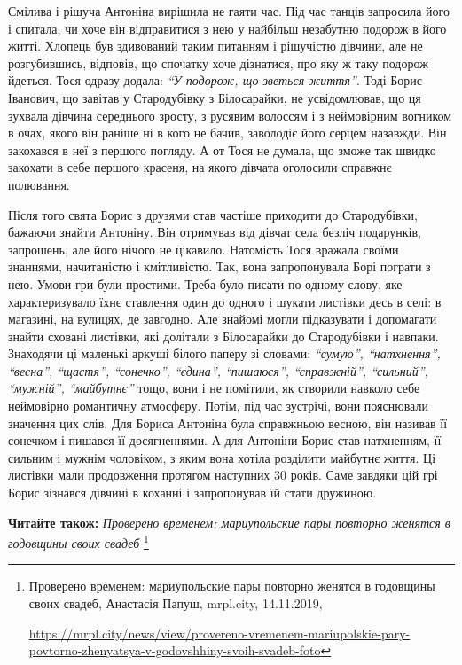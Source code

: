 
Смілива і рішуча Антоніна вирішила не гаяти час. Під час танців запросила його
і спитала, чи хоче він відправитися з нею у найбільш незабутню подорож в його
житті. Хлопець був здивований таким питанням і рішучістю дівчини, але не
розгубившись, відповів, що спочатку хоче дізнатися, про яку ж таку подорож
йдеться. Тося одразу додала: \emph{\enquote{У подорож, що зветься життя}}. Тоді Борис
Іванович, що завітав у Стародубівку з Білосарайки, не усвідомлював, що ця
зухвала дівчина середнього зросту, з русявим волоссям і з неймовірним вогником
в очах, якого він раніше ні в кого не бачив, заволодіє його серцем назавжди.
Він закохався в неї з першого погляду. А от Тося не думала, що зможе так швидко
закохати в себе першого красеня, на якого дівчата оголосили справжнє полювання.


Після того свята Борис з друзями став частіше приходити до Стародубівки,
бажаючи знайти Антоніну. Він отримував від дівчат села безліч подарунків,
запрошень, але його нічого не цікавило. Натомість Тося вражала своїми знаннями,
начитаністю і кмітливістю. Так, вона запропонувала Борі пограти з нею. Умови
гри були простими. Треба було писати по одному слову, яке характеризувало їхнє
ставлення один до одного і шукати листівки десь в селі: в магазині, на вулицях,
де завгодно. Але знайомі могли підказувати і допомагати знайти сховані
листівки, які долітали з Білосарайки до Стародубівки і навпаки. Знаходячи ці
маленькі аркуші білого паперу зі словами: \emph{\enquote{сумую}, \enquote{натхнення},
\enquote{весна}, \enquote{щастя}, \enquote{сонечко}, \enquote{єдина},
\enquote{пишаюся}, \enquote{справжній}, \enquote{сильний}, \enquote{мужній},
\enquote{майбутнє}} тощо, вони і не помітили, як створили навколо себе
неймовірно романтичну атмосферу. Потім, під час зустрічі, вони пояснювали
значення цих слів. Для Бориса Антоніна була справжньою весною, він називав її
сонечком і пишався її досягненнями. А для Антоніни Борис став натхненням, її
сильним і мужнім чоловіком, з яким вона хотіла розділити майбутнє життя. Ці
листівки мали продовження протягом наступних 30 років. Саме завдяки цій грі
Борис зізнався дівчині в коханні і запропонував їй стати дружиною.

\textbf{Читайте також:} \emph{Проверено временем: мариупольские пары повторно женятся в годовщины своих свадеб}%
\footnote{Проверено временем: мариупольские пары повторно женятся в годовщины своих свадеб, Анастасія Папуш, mrpl.city, 14.11.2019, \par%
\url{https://mrpl.city/news/view/provereno-vremenem-mariupolskie-pary-povtorno-zhenyatsya-v-godovshhiny-svoih-svadeb-foto}
}


